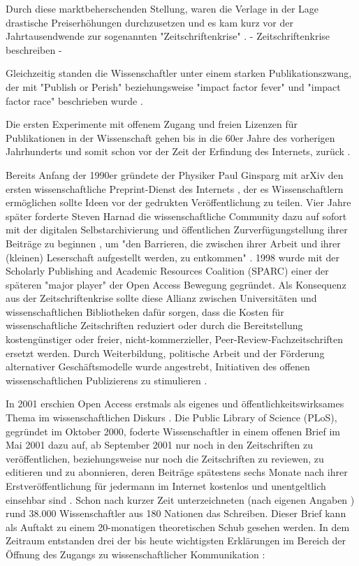 Durch diese marktbeherschenden Stellung, waren die Verlage in der Lage drastische Preiserhöhungen durchzusetzen und es kam kurz vor der Jahrtausendwende zur sogenannten "Zeitschriftenkrise" \cite{suchen}. 
- Zeitschriftenkrise beschreiben -

Gleichzeitig standen die Wissenschaftler unter einem starken Publikationszwang, der mit "Publish or Perish" \cite{CLAPHAM_2005} beziehungsweise "impact factor fever" \cite{Cherubini_2008} und "impact factor race" \cite{Brischoux_2009} beschrieben wurde \cite{offhaus_2012_institutionelle_repos}. 

Die ersten Experimente mit offenem Zugang und freien Lizenzen für Publikationen in der Wissenschaft gehen bis in die 60er Jahre des vorherigen Jahrhunderts und somit schon vor der Zeit der Erfindung des Internets, zurück \cite{cite:18b}. 

Bereits Anfang der 1990er gründete der Physiker Paul Ginsparg mit arXiv den ersten wissenschaftliche Preprint-Dienst des Internets \cite{suchen}, der es Wissenschaftlern ermöglichen sollte Ideen vor der gedrukten Veröffentlichung zu teilen. Vier Jahre später forderte Steven Harnad die wissenschaftliche Community dazu auf sofort mit der digitalen Selbstarchivierung und öffentlichen Zurverfügungstellung ihrer Beiträge zu beginnen \cite{albert_2006_open_implications}, um "den Barrieren, die zwischen ihrer Arbeit und ihrer (kleinen) Leserschaft aufgestellt werden, zu entkommen" \cite{harnad_1995_subversive_proposal}. 1998 wurde mit der Scholarly Publishing and Academic Resources Coalition (SPARC) einer der späteren "major player" der Open Access Bewegung\cite{russell2008business} gegründet. Als Konsequenz aus der Zeitschriftenkrise sollte diese Allianz zwischen Universitäten und wissenschaftlichen Bibliotheken dafür sorgen, dass die Kosten für wissenschaftliche Zeitschriften reduziert oder durch die Bereitstellung kostengünstiger oder freier, nicht-kommerzieller, Peer-Review-Fachzeitschriften ersetzt werden. Durch Weiterbildung, politische Arbeit und der Förderung alternativer Geschäftsmodelle wurde angestrebt, Initiativen des offenen wissenschaftlichen Publizierens zu stimulieren \cite{suchen}.

In 2001 erschien Open Access erstmals als eigenes und öffentlichkeitswirksames Thema im wissenschaftlichen Diskurs \cite{cite:19}. Die Public Library of Science (PLoS), gegründet im Oktober 2000, foderte Wissenschaftler in einem offenen Brief im Mai 2001 dazu auf, ab September 2001 nur noch in den Zeitschriften zu veröffentlichen, beziehungsweise nur noch die Zeitschriften zu reviewen, zu editieren und zu abonnieren, deren Beiträge spätestens sechs Monate nach ihrer Erstveröffentlichung für jedermann im Internet kostenlos und unentgeltlich einsehbar sind \cite{cite:20}. Schon nach kurzer Zeit unterzeichneten (nach eigenen Angaben \cite{cite:19a}) rund 38.000 Wissenschaftler aus 180 Nationen das Schreiben. Dieser Brief kann als Auftakt zu einem 20-monatigen theoretischen Schub gesehen werden. In dem Zeitraum entstanden drei der bis heute wichtigsten Erklärungen im Bereich der Öffnung des Zugangs zu wissenschaftlicher Kommunikation \cite{CREATe_2014}: 

